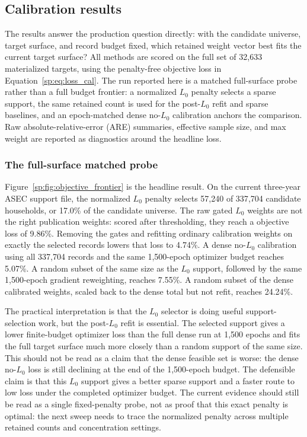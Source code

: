 \subsection{Calibration results}
\label{sp:sec:results}

The results answer the production question directly: with the candidate universe, target surface, and
record budget fixed, which retained weight vector best fits the current \populace{} target surface? All
methods are scored on the full set of 32{,}633 materialized targets, using the penalty-free \populace{}
objective loss in Equation~\ref{sp:eq:loss_cal}. The run reported here is a matched full-surface probe rather
than a full budget frontier: a normalized $L_0$ penalty selects a sparse support, the same retained count
is used for the post-$L_0$ refit and sparse baselines, and an epoch-matched dense no-$L_0$ calibration
anchors the comparison. Raw absolute-relative-error (ARE) summaries, effective sample size, and max weight
are reported as diagnostics around the headline loss.

\subsubsection{The full-surface matched probe}

Figure~\ref{sp:fig:objective_frontier} is the headline result. On the current three-year ASEC support file,
the normalized $L_0$ penalty selects 57{,}240 of 337{,}704 candidate households, or 17.0\% of the
candidate universe. The raw gated $L_0$ weights are not the right publication weights: scored after
thresholding, they reach a \populace{} objective loss of 9.86\%. Removing the gates and refitting ordinary
calibration weights on exactly the selected records lowers that loss to 4.74\%. A dense no-$L_0$
calibration using all 337{,}704 records and the same 1{,}500-epoch optimizer budget reaches 5.07\%. A
random subset of the same size as the $L_0$ support, followed by the same 1{,}500-epoch gradient
reweighting, reaches 7.55\%. A random subset of the dense calibrated weights, scaled back to the dense
total but not refit, reaches 24.24\%.

The practical interpretation is that the $L_0$ selector is doing useful support-selection work, but the
post-$L_0$ refit is essential. The selected support gives a lower finite-budget optimizer loss than
the full dense run at 1{,}500 epochs and fits the full target surface much more closely than a random
support of the same size. This should not be read as a claim that the dense feasible set is worse: the
dense no-$L_0$ loss is still declining at the end of the 1{,}500-epoch budget. The defensible claim is that
this $L_0$ support gives a better sparse support and a faster route to low loss under the completed
optimizer budget. The current evidence should still be read as a single fixed-penalty probe, not as proof
that this exact penalty is optimal: the next sweep needs to trace the normalized penalty across multiple
retained counts and concentration settings.

